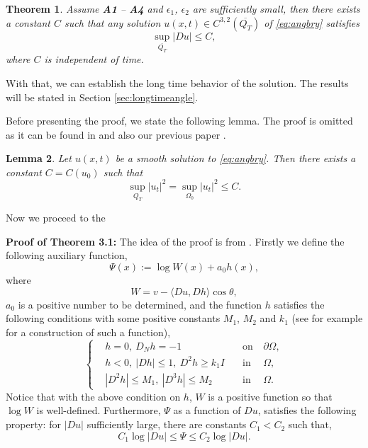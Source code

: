\documentclass[12pt]{article}
\numberwithin{equation}{section}
\theoremstyle{plain}
\newtheorem{theorem}{Theorem}[section]
\newtheorem{lemma}[theorem]{Lemma}
\theoremstyle{definition}
\theoremstyle{remark}
\begin{document}
\begin{theorem} \label{thm:3.1}
Assume {\bf A1} -- {\bf A4} and 
$\epsilon_1$, $\epsilon_2$ are sufficiently small, then
there exists a constant $C$ such that any solution $u(x,t) \in C^{3,2} (\overline{Q_T})$ of \eqref{eq:angbry}
satisfies
\begin{equation}\label{eq:ang_grad.est}
    \sup_{\overline{Q_T}} |Du| \leq C,
\end{equation}
where $C$ is independent of time.
\end{theorem}
With that, we can establish the long time behavior of the solution. The results will be stated in Section \ref{sec:longtimeangle}.

Before presenting the proof, we state the following lemma. The proof is omitted as it can be found in \cite{AW2} and also our previous paper \cite{CY1}.
\begin{lemma}\label{lem:3.2}
Let $u(x,t)$ be a smooth solution to \eqref{eq:angbry}. Then there exists a constant 
$C=C(u_0)$ such that 
\begin{equation*}
    \sup_{Q_T} |u_t|^2=\sup_{\Omega_0} |u_t|^2 \leq C.
\end{equation*}
\end{lemma} 

Now we proceed to the 

\noindent
\textbf{Proof of Theorem 3.1:} The idea of the proof is from \cite{GMWW}.
Firstly we define the following auxiliary function,
\begin{equation}
    \Psi(x) := \log W(x) + a_0 h(x),
\end{equation}
where 
\begin{equation}\label{W.CAC}
    W= v - \langle Du, Dh\rangle \cos \theta,
\end{equation}
$a_0$ is a positive number to be determined, and the function $h$ satisfies the following conditions with some positive constants $M_1$, $M_2$ and $k_1$ (see for example \cite[p.275]{CNS} for a construction of such a function),
\begin{equation}  \label{eq:h_cond}
\left\{ \begin{array}{cllcl}
           & h=0, \ D_N h=-1 \quad & \text{on} & \ \partial \Omega, \\
     & h<0, \ |Dh|\leq 1, \ D^2 h \geq k_1 I \quad & \text{in} & \ \Omega, \\
     & |D^2 h| \leq M_1,\ |D^3 h| \leq M_2 \quad & \text{in} & \ \Omega.
    \end{array}  \right.
\end{equation}
Notice that with the above condition on $h$, $W$ is a positive function so that
$\log W$ is well-defined. Furthermore, $\Psi$ as a function of $Du$, satisfies
 the following property: for $|Du|$ sufficiently large, there are constants $C_1 < C_2$ such that,
\[
C_1\log|Du|\leq \Psi \leq C_2\log|Du|.
\]
\end{document}
